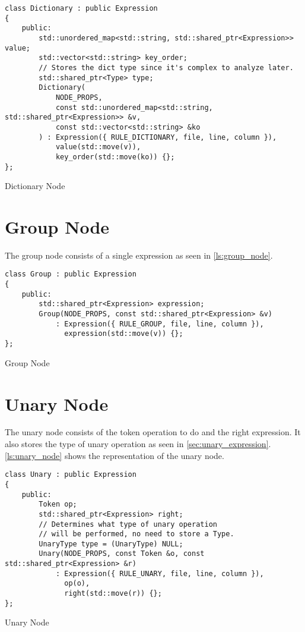 \begin{listing}[H]
\begin{verbatim}
class Dictionary : public Expression
{
    public:
        std::unordered_map<std::string, std::shared_ptr<Expression>> value;
        std::vector<std::string> key_order;
        // Stores the dict type since it's complex to analyze later.
        std::shared_ptr<Type> type;
        Dictionary(
            NODE_PROPS,
            const std::unordered_map<std::string, std::shared_ptr<Expression>> &v,
            const std::vector<std::string> &ko
        ) : Expression({ RULE_DICTIONARY, file, line, column }),
            value(std::move(v)),
            key_order(std::move(ko)) {};
};
\end{verbatim}
\caption{Dictionary Node}
\label{ls:dict_node}
\end{listing}

\section{Group Node}

The group node consists of a single expression as seen in \autoref{ls:group_node}.

\begin{listing}[H]
\begin{verbatim}
class Group : public Expression
{
    public:
        std::shared_ptr<Expression> expression;
        Group(NODE_PROPS, const std::shared_ptr<Expression> &v)
            : Expression({ RULE_GROUP, file, line, column }),
              expression(std::move(v)) {};
};
\end{verbatim}
\caption{Group Node}
\label{ls:group_node}
\end{listing}

\section{Unary Node}

The unary node consists of the token operation to do and the right expression. It also stores the type of unary operation as seen in
\autoref{sec:unary_expression}. \autoref{ls:unary_node} shows the representation of the unary node.

\begin{listing}[H]
\begin{verbatim}
class Unary : public Expression
{
    public:
        Token op;
        std::shared_ptr<Expression> right;
        // Determines what type of unary operation
        // will be performed, no need to store a Type.
        UnaryType type = (UnaryType) NULL;
        Unary(NODE_PROPS, const Token &o, const std::shared_ptr<Expression> &r)
            : Expression({ RULE_UNARY, file, line, column }),
              op(o),
              right(std::move(r)) {};
};
\end{verbatim}
\caption{Unary Node}
\label{ls:unary_node}
\end{listing}

